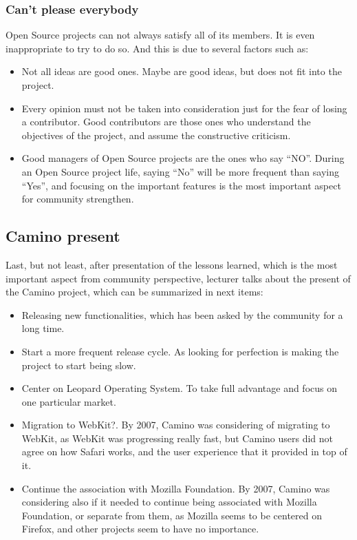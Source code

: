 \documentclass[11pt]{article}
\begin{document}
\subsubsection{Can't please everybody}
Open Source projects can not always satisfy all of its members. It is even inappropriate to try to do so. And this is due to several factors such as:
\begin{itemize}\itemsep0pt
\item{Not all ideas are good ones}. Maybe are good ideas, but does not fit into the project.
\item{Every opinion must not be taken into consideration just for the fear of losing a contributor}. Good contributors are those ones who understand the objectives of the project, and assume the constructive criticism.
\item{Good managers of Open Source projects are the ones who say ``NO''}. During an Open Source project life, saying ``No'' will be more frequent than saying ``Yes'', and focusing on the important features is the most important aspect for community strengthen.
\end{itemize}

\subsection{Camino present}
Last, but not least, after presentation of the lessons learned, which is the most important aspect from community perspective, lecturer talks about the present of the Camino project, which can be summarized in next items:
\begin{itemize}\itemsep0pt
\item{Releasing new functionalities}, which has been asked by the community for a long time.
\item{Start a more frequent release cycle}. As looking for perfection is making the project to start being slow.
\item{Center on Leopard Operating System}. To take full advantage and focus on one particular market.
\item{Migration to WebKit?}. By 2007, Camino was considering of migrating to WebKit, as WebKit was progressing really fast, but Camino users did not agree on how Safari works, and the user experience that it provided in top of it.
\item{Continue the association with Mozilla Foundation}. By 2007, Camino was considering also if it needed to continue being associated with Mozilla Foundation, or separate from them, as Mozilla seems to be centered on Firefox, and other projects seem to have no importance.
\end{itemize}
\end{document}
